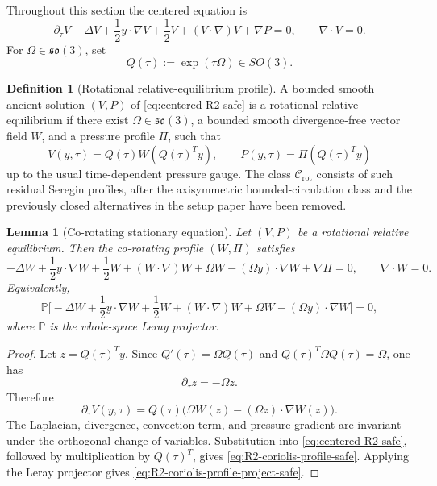 \documentclass[11pt]{amsart}
\numberwithin{equation}{section}
\theoremstyle{plain}
\newtheorem{lemma}[theorem]{Lemma}
\theoremstyle{definition}
\newtheorem{definition}[theorem]{Definition}
\theoremstyle{remark}
\newcommand{\Crot}{\mathcal C_{\mathrm{rot}}}
\begin{document}
Throughout this section the centered equation is
\begin{equation}\label{eq:centered-R2-safe}
   \partial_\tau V-\Delta V+\frac12 y\cdot\nabla V+\frac12 V
   +(V\cdot\nabla)V+\nabla P=0,
   \qquad \nabla\cdot V=0 .
\end{equation}
For \(\Omega\in\mathfrak{so}(3)\), set
\begin{equation}\label{eq:rotation-group-R2-safe}
   Q(\tau):=\exp(\tau\Omega)\in SO(3).
\end{equation}

\begin{definition}[Rotational relative-equilibrium profile]
\label{def:R2-relative-profile-safe}
A bounded smooth ancient solution \((V,P)\) of \eqref{eq:centered-R2-safe} is a
rotational relative equilibrium if there exist
\(\Omega\in\mathfrak{so}(3)\), a bounded smooth divergence-free vector field
\(W\), and a pressure profile \(\Pi\), such that
\begin{equation}\label{eq:R2-relative-form-safe}
   V(y,\tau)=Q(\tau)W(Q(\tau)^Ty),
   \qquad
   P(y,\tau)=\Pi(Q(\tau)^Ty)
\end{equation}
up to the usual time-dependent pressure gauge.
The class \(\Crot\) consists of such residual Seregin profiles, after the
axisymmetric bounded-circulation class and the previously closed alternatives in
the setup paper have been removed.
\end{definition}

\begin{lemma}[Co-rotating stationary equation]
\label{lem:co-rotating-equation-safe}
Let \((V,P)\) be a rotational relative equilibrium.  Then the co-rotating
profile \((W,\Pi)\) satisfies
\begin{equation}\label{eq:R2-coriolis-profile-safe}
   -\Delta W+\frac12 y\cdot\nabla W+\frac12 W
   +(W\cdot\nabla)W
   +\Omega W-(\Omega y)\cdot\nabla W
   +\nabla\Pi=0,
   \qquad \nabla\cdot W=0 .
\end{equation}
Equivalently,
\begin{equation}\label{eq:R2-coriolis-profile-project-safe}
   \mathbb P\Big[
   -\Delta W+\frac12 y\cdot\nabla W+\frac12 W
   +(W\cdot\nabla)W
   +\Omega W-(\Omega y)\cdot\nabla W
   \Big]=0,
\end{equation}
where \(\mathbb P\) is the whole-space Leray projector.
\end{lemma}

\begin{proof}
Let \(z=Q(\tau)^Ty\).  Since \(Q'(\tau)=\Omega Q(\tau)\) and
\(Q(\tau)^T\Omega Q(\tau)=\Omega\), one has
\[
   \partial_\tau z=-\Omega z.
\]
Therefore
\[
   \partial_\tau V(y,\tau)
   =Q(\tau)\Big(\Omega W(z)-(\Omega z)\cdot\nabla W(z)\Big).
\]
The Laplacian, divergence, convection term, and pressure gradient are invariant
under the orthogonal change of variables.  Substitution into
\eqref{eq:centered-R2-safe}, followed by multiplication by \(Q(\tau)^T\), gives
\eqref{eq:R2-coriolis-profile-safe}.  Applying the Leray projector gives
\eqref{eq:R2-coriolis-profile-project-safe}.
\end{proof}
\end{document}
